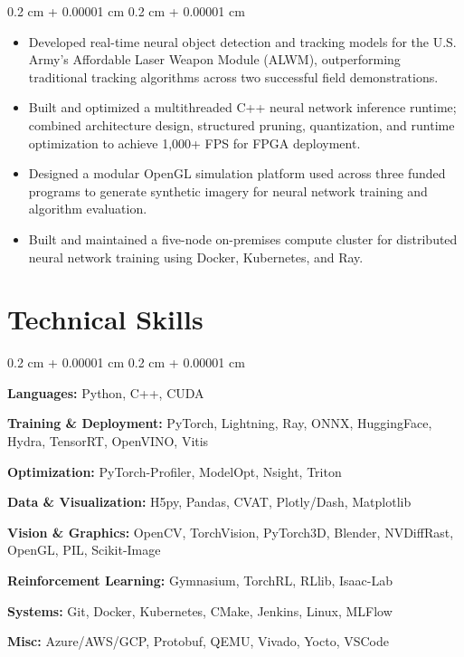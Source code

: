\documentclass[10pt, letterpaper]{article}
\newenvironment{highlights}{
    \small\linespread{0.96}\selectfont
    \begin{itemize}[
        topsep=0.04 cm,
        parsep=0.02 cm,
        partopsep=0pt,
        itemsep=0pt,
        leftmargin=0.4 cm + 10pt
    ]
}{
    \end{itemize}
}
\newenvironment{onecolentry}{
    \begin{adjustwidth}{
        0.2 cm + 0.00001 cm
    }{
        0.2 cm + 0.00001 cm
    }
}{
    \end{adjustwidth}
}
\begin{document}
\begin{onecolentry}\begin{highlights}
\item {\small Developed real-time neural object detection and tracking models for the U.S. Army's Affordable Laser Weapon Module (ALWM), outperforming traditional tracking algorithms across two successful field demonstrations.}
\item {\small Built and optimized a multithreaded C++ neural network inference runtime; combined architecture design, structured pruning, quantization, and runtime optimization to achieve 1,000+ FPS for FPGA deployment.}
\item {\small Designed a modular OpenGL simulation platform used across three funded programs to generate synthetic imagery for neural network training and algorithm evaluation.}
\item {\small Built and maintained a five-node on-premises compute cluster for distributed neural network training using Docker, Kubernetes, and Ray.}
\end{highlights}\end{onecolentry}

    \section{Technical Skills}
\begin{samepage}
\begin{onecolentry}
\begin{minipage}[t]{0.48\linewidth}\small\linespread{0.96}\selectfont\raggedright
\textbf{Languages:} Python, C++, CUDA\par
\vspace{0.1 cm}
\textbf{Training \& Deployment:} PyTorch, Lightning, Ray, ONNX, HuggingFace, Hydra, TensorRT, OpenVINO, Vitis\par
\vspace{0.1 cm}
\textbf{Optimization:} PyTorch-Profiler, ModelOpt, Nsight, Triton\par
\vspace{0.1 cm}
\textbf{Data \& Visualization:} H5py, Pandas, CVAT, Plotly/Dash, Matplotlib\par
\end{minipage}%
\hfill
\begin{minipage}[t]{0.48\linewidth}\small\linespread{0.96}\selectfont\raggedright
\textbf{Vision \& Graphics:} OpenCV, TorchVision, PyTorch3D, Blender, NVDiffRast, OpenGL, PIL, Scikit-Image\par
\vspace{0.1 cm}
\textbf{Reinforcement Learning:} Gymnasium, TorchRL, RLlib, Isaac-Lab\par
\vspace{0.1 cm}
\textbf{Systems:} Git, Docker, Kubernetes, CMake, Jenkins, Linux, MLFlow\par
\vspace{0.1 cm}
\textbf{Misc:} Azure/AWS/GCP, Protobuf, QEMU, Vivado, Yocto, VSCode\par
\end{minipage}%
\end{onecolentry}
\end{samepage}
\end{document}

